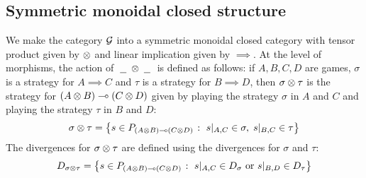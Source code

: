 \documentclass{article}
\begin{document}
\subsection{Symmetric monoidal closed structure}

We make the category $\mathcal G$ into a symmetric monoidal closed category with tensor product given by $\otimes$ and linear implication given by $\implies$.  At the level of morphisms, the action of $\;\underline{\hspace{1.5ex}}\;\otimes\;\underline{\hspace{1.5ex}}\;$ is defined as follows: if $A,B,C,D$ are games, $\sigma$ is a strategy for $A\implies C$ and $\tau$ is a strategy for $B\implies D$, then $\sigma\otimes\tau$ is the strategy for $(A\otimes B)\multimap (C\otimes D)$ given by playing the strategy $\sigma$ in $A$ and $C$ and playing the strategy $\tau$ in $B$ and $D$:
\[
  \sigma\otimes\tau = \left\{s\in P_{(A\otimes B)\multimap (C\otimes D)}\;\colon\; s\vert_{A,C}\in\sigma,\;s\vert_{B,C}\in\tau\right\}
  \]
The divergences for $\sigma\otimes\tau$ are defined using the divergences for $\sigma$ and $\tau$:
\[
  D_{\sigma\otimes\tau} = \left\{s\in P_{(A\otimes B)\multimap (C\otimes D)}\;\colon\; s\vert_{A,C}\in D_\sigma\textrm{ or }s\vert_{B,D}\in D_\tau\right\}
  \]
\end{document}
